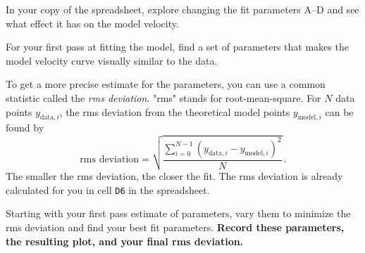 
%

\begin{steps}
	\item In your copy of the spreadsheet, explore changing the fit parameters A--D and see what effect it has on the model velocity.
	
	\item For your first pass at fitting the model, find a set of parameters that makes the model velocity curve visually similar to the data.
\end{steps}

To get a more precise estimate for the parameters, you can use a common statistic called the \textit{rms deviation}. "rms" stands for root-mean-square. For $N$ data points $y_{\textrm{data},i}$, the rms deviation from the theoretical model points $y_{\textrm{model},i}$ can be found by
\begin{equation}
 \textrm{rms deviation} = \sqrt{\dfrac{\sum_{i=0}^{N-1} \left( y_{\textrm{data},i} - y_{\textrm{model},i} \right)^2}{N}} \,.
\end{equation}
The smaller the rms deviation, the closer the fit. The rms deviation is already calculated for you in cell \texttt{D6} in the spreadsheet.

\begin{steps}
	\item Starting with your first pass estimate of parameters, vary them to minimize the rms deviation and find your best fit parameters. \textbf{Record these parameters, the resulting plot, and your final rms deviation.}
\end{steps}

